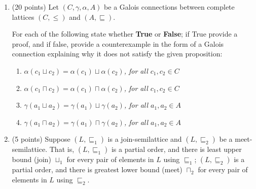 \documentclass[12pt]{article}
\begin{document}
\begin{enumerate}
\begin{mdframed}
\end{mdframed}


\item  (20 points) 
Let $(C, \gamma, \alpha, A)$ be a Galois connections between complete lattices 
$(C, \leq)$ and $(A, \sqsubseteq)$.

For each of the following state whether \textbf{True} or \textbf{False}; 
if True provide a proof, and if false, provide a counterexample in the form 
of a Galois connection explaining why it does not satisfy the given proposition: 

\begin{enumerate}
  \item 
 \emph{$\alpha ( c_1 \sqcup c_2 ) = \alpha(c_1) \sqcup \alpha(c_2)$, for all $c_1, c_2 \in C$}
 \begin{mdframed}
    \vspace{2em}
\end{mdframed}

\item 
 \emph{$\alpha ( c_1 \sqcap c_2 ) = \alpha(c_1) \sqcap \alpha(c_2)$, for all $c_1, c_2 \in C$}
 \begin{mdframed}
    \vspace{2em}
\end{mdframed}

\item 
 \emph{$\gamma ( a_1 \sqcup a_2 ) = \gamma(a_1) \sqcup \gamma(a_2)$, for all $a_1, a_2 \in A$}
 \begin{mdframed}
    \vspace{2em}
\end{mdframed}

\item 
 \emph{$\gamma ( a_1 \sqcap a_2 ) = \gamma(a_1) \sqcap \gamma(a_2)$, for all $a_1, a_2 \in A$}
 \begin{mdframed}
    \vspace{2em}
\end{mdframed}


\end{enumerate}
\newpage

\item (5 points) Suppose $(L, \sqsubseteq_1)$ is a join-semilattice and $(L,
\sqsubseteq_2)$ be a meet-semilattice. 
%
That is, $(L, \sqsubseteq_1)$ is a partial order, and there is least upper bound
(join) $\sqcup_1$ for every pair of elements in $L$ using $\sqsubseteq_1$; 
$(L, \sqsubseteq_2)$ is a partial order, and there is greatest
lower bound (meet) $\sqcap_2$ for every pair of elements in $L$ using
$\sqsubseteq_2$. 


\end{enumerate}
\end{document}
